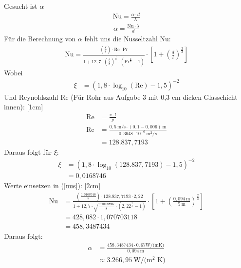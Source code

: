 \documentclass[a4paper,10pt]{article}
\begin{document}
Gesucht ist $\alpha$
\begin{align*}
\text{Nu} = \frac{\alpha \cdot d}{\lambda}
\end{align*}
\begin{align} \label{alpha}
\alpha = \frac{\text{Nu} \cdot \lambda}{d}
\end{align}
Für die Berechnung von $\alpha$ fehlt uns die Nusseltzahl Nu:
\begin{align}\label{nus}
\text{Nu} = \frac{(\frac{\xi}{8}) \cdot \text{Re} \cdot \text{Pr}}{1 + 12,7 \cdot (\frac{\xi}{8})^{\frac{1}{2}} \cdot (\text{Pr}^{\frac{2}{3}}-1)} \cdot \left[ 1 + (\frac{d}{l})^{\frac{2}{3}} \right]
\end{align}
Wobei
\begin{align*}
\xi &= (1,8 \cdot \log_{10} (\text{Re}) - 1,5)^{-2}
\end{align*}
Und Reynoldszahl Re (Für Rohr aus Aufgabe 3 mit 0,3 cm dicken Glasschicht innen):
\reversemarginpar
{}[1cm]
\begin{align*}
\text{Re} &= \frac{v \cdot l}{\nu} \\
\text{Re} &= \frac{0,5~ \text{m/s} \cdot (0,1-0,006)~\text{m}}{0,3648 \cdot 10^{-6} ~\text{m}^2 /s} \\
&= 128.837,7193
\end{align*}
Daraus folgt für $\xi$:
\begin{align*}
\xi &= (1,8 \cdot \log_{10} (128.837,7193) - 1,5)^{-2} \\
 &= 0,0168746
\end{align*}
Werte einsetzen in (\ref{nus}):
\marginnote[hier ist d = Rohrinnendurchmesser und l = Länge des Rohres]{}[2cm]
\begin{align*}
\text{Nu} &= \frac{(\frac{0,0168746}{8}) \cdot  128.837,7193 \cdot 2,22}{1 + 12,7 \cdot \sqrt{\frac{0,0168746}{8}} \cdot (2,22^{\frac{2}{3}}-1)} \cdot \left[ 1 + (\frac{0,094 ~ \text{m}}{5 ~ \text{m}})^{\frac{2}{3}} \right] \\
 &= 428,082 \cdot 1,070703118 \\
 &= 458,3487434
\end{align*}
Daraus folgt:
\begin{align*}
\alpha &= \frac{458,3487434 \cdot 0,67 \text{W/(mK)}}{ 0,094~ \text{m}} \\
 &\approx 3.266,95 ~ \text{W/(m$^2$ K)}
\end{align*}
\end{document}
